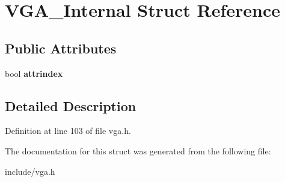 \hypertarget{structVGA__Internal}{\section{V\-G\-A\-\_\-\-Internal Struct Reference}
\label{structVGA__Internal}
}
\subsection*{Public Attributes}
\begin{DoxyCompactItemize}
\item 
\hypertarget{structVGA__Internal_a36feb3e3abbf2c0f50f3fbe45ad763aa}{bool {\bfseries attrindex}}\label{structVGA__Internal_a36feb3e3abbf2c0f50f3fbe45ad763aa}

\end{DoxyCompactItemize}


\subsection{Detailed Description}


Definition at line 103 of file vga.\-h.



The documentation for this struct was generated from the following file\-:\begin{DoxyCompactItemize}
\item 
include/vga.\-h\end{DoxyCompactItemize}
